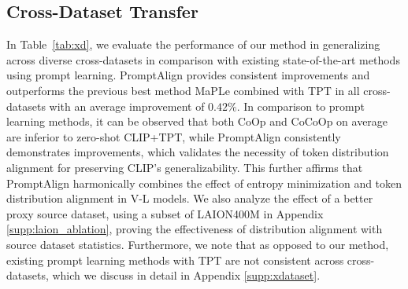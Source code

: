 \documentclass[a4paper]{article}
\begin{document}
\subsection{Cross-Dataset Transfer}
In Table~\ref{tab:xd}, we evaluate the performance of our method in generalizing across diverse cross-datasets in comparison with existing state-of-the-art methods using prompt learning. PromptAlign provides consistent improvements and outperforms the previous best method MaPLe combined with TPT in all cross-datasets with an average improvement of $0.42\%$. In comparison to prompt learning methods, it can be observed that both CoOp and CoCoOp on average are inferior to zero-shot CLIP+TPT, while PromptAlign consistently demonstrates improvements, which validates the necessity of token distribution alignment for preserving CLIP's generalizability. This further affirms that PromptAlign harmonically combines the effect of entropy minimization and token distribution alignment in V-L models. We also analyze the effect of a better proxy source dataset, using a subset of LAION400M in Appendix \ref{supp:laion_ablation}, proving the effectiveness of distribution alignment with source dataset statistics. Furthermore, we note that as opposed to our method, existing prompt learning methods with TPT are not consistent across cross-datasets, which we discuss in detail in Appendix \ref{supp:xdataset}. 

\end{document}
